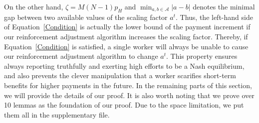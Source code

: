 \documentclass{article}
\begin{document}
On the other hand, $\zeta= M(N-1)p_H$ and ${\min}_{a,b\in\mathcal{A}}|a-b|$ denotes the minimal gap between two available values of the scaling factor $a^t$.
Thus, the left-hand side of Equation~\ref{Condition} is actually the lower bound of the payment increment if our reinforcement adjustment algorithm increases the scaling factor.
Thereby, if Equation~\ref{Condition} is satisfied, a single worker will always be unable to cause our reinforcement adjustment algorithm to change $a^t$.
This property ensures always reporting truthfully and exerting high efforts to be a Nash equilibrium, and also prevents the clever manipulation that a worker scarifies short-term benefits for higher payments in the future.
In the remaining parts of this section, we will provide the details of our proof.
It is also worth noting that we prove over 10 lemmas as the foundation of our proof.
Due to the space limitation, we put them all in the supplementary file.
\end{document}
